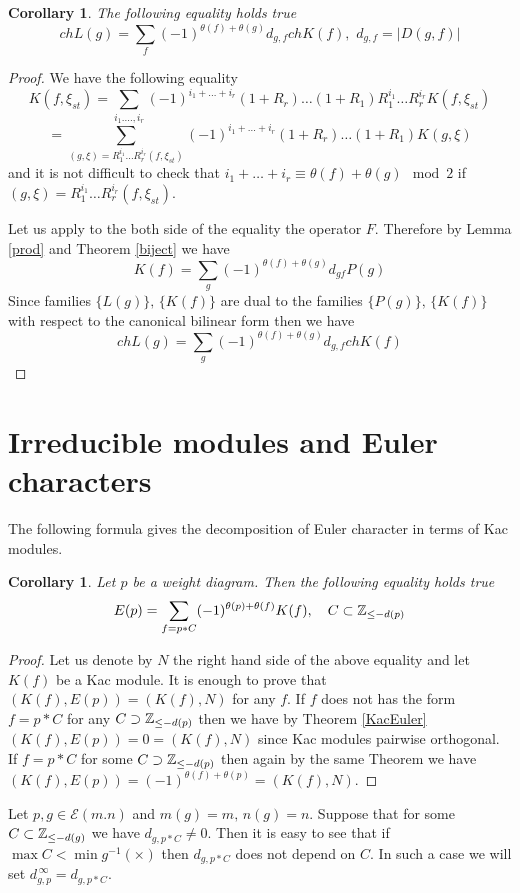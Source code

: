 \documentclass[12pt,reqno]{amsart}
\newtheorem{corollary}[thm]{Corollary}
\begin{document}
\begin{corollary}  The following equality holds true
$$
chL(g)=\sum_{f}(-1)^{\theta(f)+\theta(g)}d_{g,f}chK(f),\,\,d_{g,f}=|D(g,f)|
$$
\end{corollary}
\begin{proof}  We have the following equality 
$$
K(f,\xi_{st})=\sum_{i_1.\dots,i_r}(-1)^{i_1+\dots+i_r}(1+R_r)\dots (1+R_1)R_1^{i_1}\dots R_r^{i_r}K(f,\xi_{st})
$$
$$
=\sum_{(g,\xi)=R_1^{i_1}\dots R_r^{i_r}(f,\xi_{st})}(-1)^{i_1+\dots+i_r}(1+R_r)\dots (1+R_1)K(g,\xi)
$$
and it is not difficult to check that $i_1+\dots+i_r\equiv\theta(f)+\theta(g) \mod 2$ if $(g,\xi)=R_1^{i_1}\dots R_r^{i_r}(f,\xi_{st}).$

Let us apply to the both side of the equality the operator $F$. Therefore  by Lemma  \ref{prod}  and Theorem  \ref{biject} we have 
$$
K(f)=\sum_{g}(-1)^{\theta(f)+\theta(g)}d_{gf}P(g)
$$
Since families  $\{L(g)\},\,\{K(f)\}$ are dual to the families $\{P(g)\},\,\{K(f)\}$ with respect to  the canonical bilinear form  then we have 
$$
chL(g)=\sum_{g}(-1)^{\theta(f)+\theta(g)}d_{g,f}chK(f)
$$
\end{proof}
 
 \section{Irreducible modules and Euler characters}
 The following formula gives the decomposition of Euler character in terms of Kac modules. 
 \begin{corollary}\label{EulerKac} Let $p$ be a weight diagram. Then the following equality holds true
 $$
 E(p)=\sum_{f=p*C}(-1)^{\theta(p)+\theta(f)}K(f),\quad C\subset\Bbb Z_{\le -d(p)}
 $$
 \end{corollary}  
 
 \begin{proof} Let us  denote  by $N$ the right hand side of the above equality and let $K(f)$ be a Kac module. It is enough to prove that $(K(f),E(p))=(K(f),N)$ for any $f$. If $f$ does not has the form $f=p*C$ for any $C\supset \Bbb Z_{\le -d(p)}$ then we have  by  Theorem \ref{KacEuler}  $(K(f),E(p))=0=(K(f),N)$ since Kac modules pairwise orthogonal. If $f=p*C$  for some $C\supset \Bbb Z_{\le -d(p)}$ then again by the same Theorem we have $(K(f),E(p))=(-1)^{\theta(f)+\theta(p)}=(K(f),N)$.
 \end{proof}
 


 Let $p,g\in \mathcal E(m.n)$ and $m(g)=m,\,n(g)=n$. Suppose that for some $C\subset \Bbb Z_{\le -d(g)}$ we have  $d_{g,p*C}\ne0$.  Then it is easy to see that  if $\max C<\min g^{-1}(\times)$ then $d_{g,p*C}$ does not depend on $C$. In such a case  we will  set $d^{\,\infty}_{g,p}=d_{g,p*C}$.
 
\end{document}
